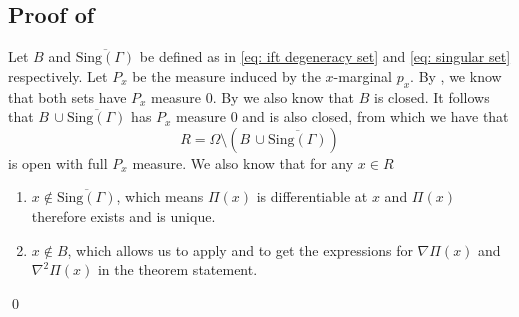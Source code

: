 \documentclass[11pt]{article}
\begin{document}
\subsection{Proof of } \label{sec: proof of differentiability of pi}
Let $B$ and $\overline{\text{Sing}(\Gamma)}$ be defined as in \cref{eq: ift degeneracy set} and \cref{eq: singular set} respectively. Let $P_x$ be the measure induced by the $x$-marginal $p_x$. By ,  we know that both sets have $P_x$ measure $0$. By  we also know that $B$ is closed. It follows that $B \, \cup \overline{\text{Sing}(\Gamma)}$ has $P_x$ measure $0$ and is also closed, from which we have that 
\begin{equation}
    R = \Omega \setminus \left( B \, \cup \overline{\text{Sing}(\Gamma)}\right) \label{eq: good set}
\end{equation}
is open with full $P_x$ measure. We also know that for any $x \in R$
\begin{enumerate}
    \item $x \notin \overline{\text{Sing}(\Gamma)}$, which means $\Pi(x)$ is differentiable at $x$ and $\Pi(x)$ therefore exists and is unique. 
    \item $x \notin B$, which allows us to apply  and  to get the expressions for $\nabla\Pi(x)$ and $\nabla^2\Pi(x)$ in the theorem statement.
\end{enumerate}
\qed{}
\end{document}
